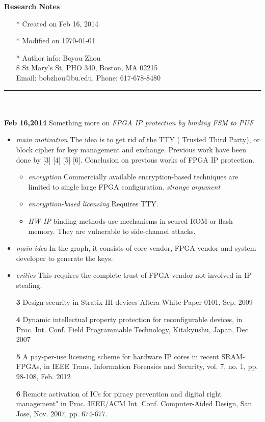 \documentclass[]{article}
\begin{document}
\pagestyle{empty}
{\large\textbf{Research Notes}}
\begin{itemize}
    \item[*] Created on Feb 16, 2014
    \item[*] Modified on \today
    \item[*] Author info: Boyou Zhou\\
             8 St Mary's St, PHO 340, Boston, MA 02215\\
             Email: bobzhou@bu.edu, Phone: 617-678-8480
\end{itemize}


\rule[-0.1cm]{7.5in}{0.01cm}\\
\\
\noindent \textbf{Feb 16,2014}
Something more on \textit{FPGA IP protection by binding FSM to PUF}
\indent		\begin{itemize}
            \item \textit{main motivation} The idea is to get rid of the TTY (
            Trusted Third Party), or block cipher for key management and
            exchange. Previous work have been done by [3] [4] [5] [6].
            Conclusion on previous works of FPGA IP protection.
                \begin{itemize}
                \item \textit{encryption} Commercially available
                    encryption-based techniques are limited to single large FPGA
                    configuration. \textit{strange argument}
                \item \textit{encryption-based licensing} Requires TTY.
                \item \textit{HW-IP} binding methods use mechanisms in scured
                    ROM or flash memory. They are vulnerable to side-channel
                    attacks.
                \end{itemize}
            \item \textit{main idea} In the graph, it consists of core vendor,
                FPGA vendor and system developer to generate the keys. 
            \item \textit{critics} This requires the complete trust of FPGA
                vendor not involved in IP stealing.
            \item [\textbf{3}] Design security in Stratix III devices Altera White Paper
                0101, Sep. 2009
            \item [\textbf{4}] Dynamic intellectual property protection for
                reconfigurable devices, in Proc. Int. Conf. Field Programmable
                Technology, Kitakyushu, Japan, Dec. 2007
            \item [\textbf{5}] A pay-per-use licensing scheme for hardware IP cores in
                recent SRAM-FPGAs, in IEEE Trans. Information Forensics and
                Security, vol. 7, no. 1, pp. 98-108, Feb. 2012
            \item [\textbf{6}] Remote activation of ICs for piracy prevention and digital
            right management" in Proc. IEEE/ACM Int. Conf. Computer-Aided
            Design, San Jose, Nov. 2007, pp. 674-677.
        \end{itemize}
\end{document}
